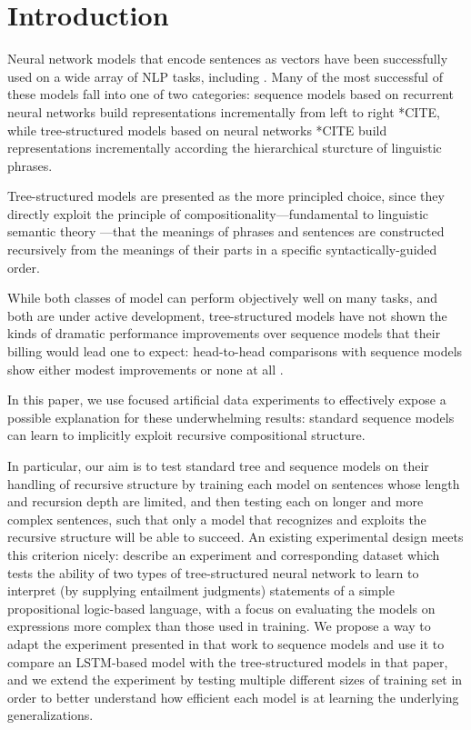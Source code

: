 \section{Introduction}\label{sec:intro}

Neural network models that encode sentences as vectors have been successfully used on a wide array of NLP tasks, including . Many of the most successful of these models fall into one of two categories: sequence models based on recurrent neural networks build representations incrementally from left to right *CITE, while tree-structured models based on  neural networks *CITE build representations incrementally according the hierarchical sturcture of linguistic phrases. 

Tree-structured models are presented as the more principled choice, since they directly exploit the principle of compositionality---fundamental to linguistic semantic theory \cite{Partee84,Janssen97}---that the meanings of phrases and sentences are constructed recursively from the meanings of their parts in a specific syntactically-guided order.

While both classes of model can perform objectively well on many tasks, and both are under active development, tree-structured models have not shown the kinds of dramatic performance improvements over sequence models that their billing would lead one to expect: head-to-head comparisons with sequence models show either modest improvements  or none at all . 

In this paper, we use focused artificial data experiments to effectively expose a possible explanation for these underwhelming results: standard sequence models can learn to implicitly exploit recursive compositional structure.

In particular, our aim is to test standard tree and sequence models on their handling of recursive structure by training each model on sentences whose length and recursion depth are limited, and then testing each on longer and more complex sentences, such that only a model that recognizes and exploits the recursive structure will be able to succeed. An existing experimental design meets this criterion nicely: describe an experiment and corresponding dataset which tests the ability of two types of tree-structured neural network to learn to interpret (by supplying entailment judgments) statements of a simple propositional logic-based language, with a focus on evaluating the models on expressions more complex than those used in training. We propose a way to adapt the experiment presented in that work to sequence models and use it to compare an LSTM-based model with the tree-structured models in that paper, and we extend the experiment by testing multiple different sizes of training set in order to better understand how efficient each model is at learning the underlying generalizations.

